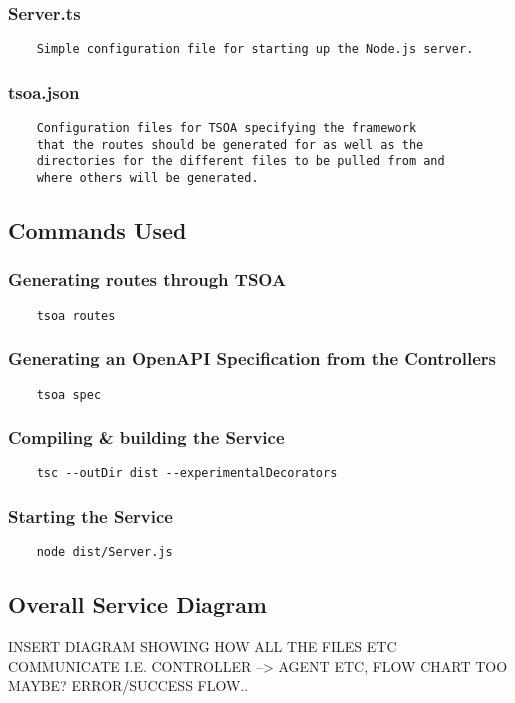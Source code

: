 \subsubsection{Server.ts}
\begin{verbatim}
    Simple configuration file for starting up the Node.js server.
\end{verbatim}
\subsubsection{tsoa.json}
\begin{verbatim}
    Configuration files for TSOA specifying the framework 
    that the routes should be generated for as well as the 
    directories for the different files to be pulled from and 
    where others will be generated.
\end{verbatim}
\subsection{Commands Used}
\subsubsection{Generating routes through TSOA}
\begin{verbatim}
    tsoa routes
\end{verbatim}
\subsubsection{Generating an OpenAPI Specification from the Controllers}
\begin{verbatim}
    tsoa spec
\end{verbatim}
\subsubsection{Compiling \& building the Service}
\begin{verbatim}
    tsc --outDir dist --experimentalDecorators
\end{verbatim}
\subsubsection{Starting the Service}
\begin{verbatim}
    node dist/Server.js
\end{verbatim}

\subsection{Overall Service Diagram}
INSERT DIAGRAM SHOWING HOW ALL THE FILES ETC COMMUNICATE I.E. CONTROLLER --> AGENT ETC, FLOW CHART TOO MAYBE? ERROR/SUCCESS FLOW..

